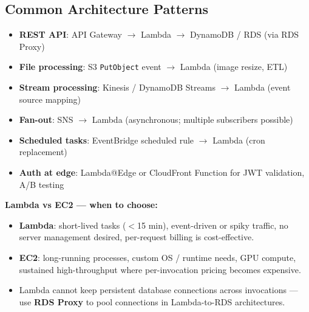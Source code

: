 \subsection{Common Architecture Patterns}

\begin{itemize}
  \item \textbf{REST API}: API Gateway $\rightarrow$ Lambda $\rightarrow$ DynamoDB / RDS (via RDS Proxy)
  \item \textbf{File processing}: S3 \texttt{PutObject} event $\rightarrow$ Lambda (image resize, ETL)
  \item \textbf{Stream processing}: Kinesis / DynamoDB Streams $\rightarrow$ Lambda (event source mapping)
  \item \textbf{Fan-out}: SNS $\rightarrow$ Lambda (asynchronous; multiple subscribers possible)
  \item \textbf{Scheduled tasks}: EventBridge scheduled rule $\rightarrow$ Lambda (cron replacement)
  \item \textbf{Auth at edge}: Lambda@Edge or CloudFront Function for JWT validation, A/B testing
\end{itemize}

\begin{saadepth}
\textbf{Lambda vs EC2 --- when to choose:}
\begin{itemize}
  \item \textbf{Lambda}: short-lived tasks ($<$15 min), event-driven or spiky traffic,
        no server management desired, per-request billing is cost-effective.
  \item \textbf{EC2}: long-running processes, custom OS / runtime needs, GPU compute,
        sustained high-throughput where per-invocation pricing becomes expensive.
  \item Lambda cannot keep persistent database connections across invocations ---
        use \textbf{RDS Proxy} to pool connections in Lambda-to-RDS architectures.
\end{itemize}
\end{saadepth}

